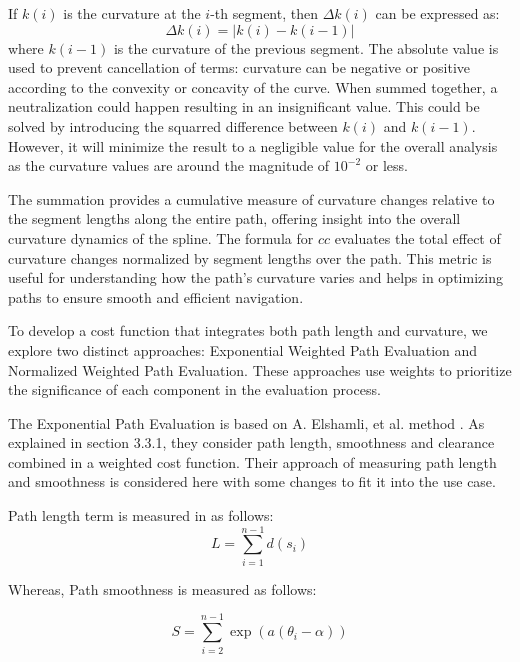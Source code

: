 If \(k(i)\) is the curvature at the \(i\)-th segment, then \( \Delta k(i) \) can be expressed as:
\begin{equation}
    \Delta k(i) = \left| k(i) - k(i-1) \right|
\end{equation}
where \(k(i-1)\) is the curvature of the previous segment. The absolute value is used to prevent cancellation of terms:
curvature can be negative or positive according to the convexity or concavity of the curve. When summed together,
a neutralization could happen resulting in an insignificant value. This could be solved by introducing the squarred 
difference between \(k(i)\) and \(k(i-1)\). However, it will minimize the result to a negligible value for the 
overall analysis as the curvature values are around the magnitude of \(10^{-2}\) or less.

The summation provides a cumulative measure of curvature changes relative to the segment lengths along the entire path, 
offering insight into the overall curvature dynamics of the spline. The formula for \(cc\) evaluates the total effect 
of curvature changes normalized by segment lengths over 
the path. This metric is useful for understanding how the path’s curvature varies and helps in optimizing paths 
to ensure smooth and efficient navigation.

To develop a cost function that integrates both path length and curvature, we explore two distinct approaches: 
Exponential Weighted Path Evaluation and Normalized Weighted Path Evaluation. These approaches use weights to 
prioritize the significance of each component in the evaluation process. 

The Exponential Path Evaluation is based on A. Elshamli, et al. method \cite{R17}. As explained in section 3.3.1,
they consider path length, smoothness and clearance combined in a weighted cost function.
Their approach of measuring path length and smoothness is considered here with some changes to fit it into the use case.

Path length term is measured in \cite{R17} as follows:
\begin{equation}
L = \sum_{i=1}^{n-1} d(s_i)
\end{equation}

Whereas, Path smoothness is measured as follows:

\begin{equation}
S = \sum_{i=2}^{n-1} \exp(a(\theta_i - \alpha))
\end{equation}

